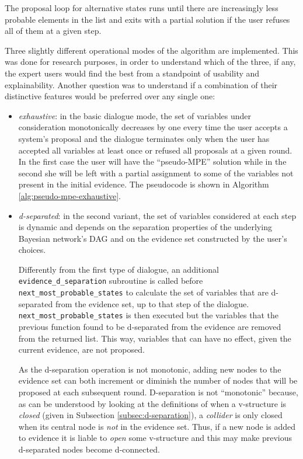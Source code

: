 The proposal loop for alternative states runs until there are increasingly less probable elements in the list and exits with a partial solution if the user refuses all of them at a given step.

Three slightly different operational modes of the algorithm are implemented.
This was done for research purposes, in order to understand which of the three, if any, the expert users would find the best from a standpoint of usability and explainability.
Another question was to understand if a combination of their distinctive features would be preferred over any single one:
\begin{itemize}
  \item \textit{exhaustive}: in the basic dialogue mode, the set of variables under consideration monotonically decreases by one every time the user accepts a system's proposal and the dialogue terminates only when the user has accepted all variables at least once or refused all proposals at a given round.
	In the first case the user will have the \enquote{pseudo-MPE} solution while in the second she will be left with a partial assignment to some of the variables not present in the initial evidence.
	The pseudocode is shown in Algorithm \ref{alg:pseudo-mpe-exhaustive}.
	
  \item \textit{d-separated}: in the second variant, the set of variables considered at each step is dynamic and depends on the separation properties of the underlying Bayesian network's DAG and on the evidence set constructed by the user's choices.
  
  	Differently from the first type of dialogue, an additional \texttt{evidence\_d\_separation} subroutine is called before \texttt{next\_most\_probable\_states} to calculate the set of variables that are d-separated from the evidence set, up to that step of the dialogue.\\
  	\texttt{next\_most\_probable\_states} is then executed but the variables that the previous function found to be d-separated from the evidence are removed from the returned list.
  	This way, variables that can have no effect, given the current evidence, are not proposed.
  	
  	As the d-separation operation is not monotonic, adding new nodes to the evidence set can both increment or diminish the number of nodes that will be proposed at each subsequent round.
  	D-separation is not \enquote{monotonic} because, as can be understood by looking at the definitions of when a v-structure is \textit{closed} (given in Subsection \ref{subsec:d-separation}), a \textit{collider} is only closed when its central node is \textit{not} in the evidence set.
  	Thus, if a new node is added to evidence it is liable to \textit{open} some v-structure and this may make previous d-separated nodes become d-connected.
  	

\end{itemize}

